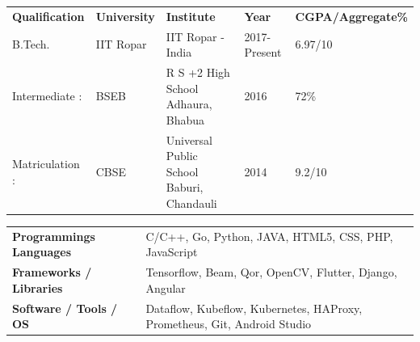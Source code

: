 \documentclass[a4paper,12pt]{awesome}
\newcommand{\psep}{-0.6cm}
\begin{document}
\begin{tabular}{ l @{\hskip 0.12in} l @{\hskip 0.12in} l @{\hskip 0.12in} l @{\hskip 0.12in} l }

\textbf{Qualification} & \textbf{University} & \textbf{Institute} & \textbf{Year} & \textbf{CGPA/Aggregate\%} \\

B.Tech.& IIT Ropar & IIT Ropar  - India & 2017-Present & 6.97/10 \\
Intermediate :& BSEB & R S +2 High School Adhaura, Bhabua & 2016  &  72\% \\
Matriculation :& CBSE & Universal Public School Baburi, Chandauli  & 2014& 9.2/10 \\
\end{tabular} \linebreak
{}\linebreak
\indent 
\begin{tabular}{ l @{\hskip 0.006cm} l }
    \textbf{Programmings Languages } & C/C++, Go, Python, JAVA, HTML5, CSS, PHP, JavaScript \\
    \textbf{Frameworks / Libraries} & Tensorflow, Beam, Qor, OpenCV, Flutter, Django, Angular \\ 
    \textbf{Software / Tools / OS} & Dataflow, Kubeflow, Kubernetes, HAProxy, Prometheus, Git, Android Studio  \\
\end{tabular}\\
\linebreak
{}\\[\psep]
\end{document}
